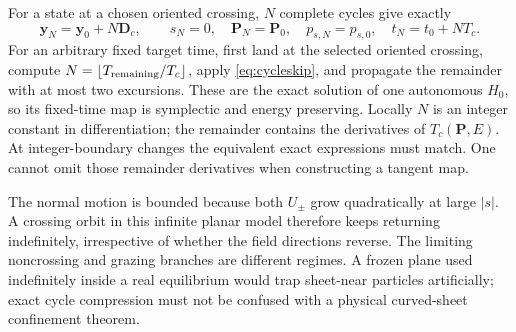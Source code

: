 \documentclass[10pt,a4paper]{article}
\newcommand{\y}{\mathbf y}\newcommand{\x}{\mathbf x}\renewcommand{\v}{\mathbf v}\newcommand{\p}{\mathbf p}
\begin{document}
For a state at a chosen oriented crossing, $N$ complete cycles give exactly
\begin{equation}\label{eq:cycleskip}
 \y_N=\y_0+N\mathbf D_c,\qquad
 s_N=0,\quad\mathbf P_N=\mathbf P_0,\quad p_{s,N}=p_{s,0},\quad
 t_N=t_0+NT_c.
\end{equation}
For an arbitrary fixed target time, first land at the selected oriented crossing, compute $N=\lfloor T_{\rm remaining}/T_c\rfloor$, apply \eqref{eq:cycleskip}, and propagate the remainder with at most two excursions. These are the exact solution of one autonomous $H_0$, so its fixed-time map is symplectic and energy preserving. Locally $N$ is an integer constant in differentiation; the remainder contains the derivatives of $T_c(\mathbf P,E)$. At integer-boundary changes the equivalent exact expressions must match. One cannot omit those remainder derivatives when constructing a tangent map.

The normal motion is bounded because both $U_\pm$ grow quadratically at large $|s|$. A crossing orbit in this infinite planar model therefore keeps returning indefinitely, irrespective of whether the field directions reverse. The limiting noncrossing and grazing branches are different regimes. A frozen plane used indefinitely inside a real equilibrium would trap sheet-near particles artificially; exact cycle compression must not be confused with a physical curved-sheet confinement theorem.
\end{document}
